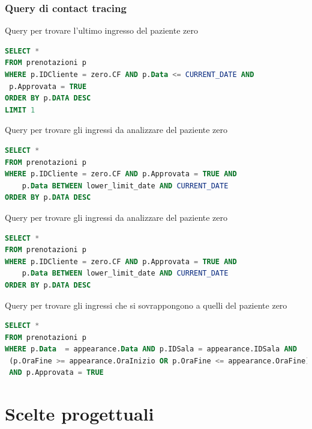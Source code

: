 \documentclass[a4paper,11pt,titlepage]{article}
\begin{document}
\subsubsection{Query di contact tracing}
Query per trovare l'ultimo ingresso del paziente zero
\begin{lstlisting}[language=SQL]
SELECT *
FROM prenotazioni p
WHERE p.IDCliente = zero.CF AND p.Data <= CURRENT_DATE AND
 p.Approvata = TRUE
ORDER BY p.DATA DESC
LIMIT 1
\end{lstlisting}

Query per trovare gli ingressi da analizzare del paziente zero
\begin{lstlisting}[language=SQL]
SELECT *
FROM prenotazioni p
WHERE p.IDCliente = zero.CF AND p.Approvata = TRUE AND
	p.Data BETWEEN lower_limit_date AND CURRENT_DATE
ORDER BY p.DATA DESC
\end{lstlisting}

Query per trovare gli ingressi da analizzare del paziente zero
\begin{lstlisting}[language=SQL]
SELECT *
FROM prenotazioni p
WHERE p.IDCliente = zero.CF AND p.Approvata = TRUE AND
	p.Data BETWEEN lower_limit_date AND CURRENT_DATE
ORDER BY p.DATA DESC
\end{lstlisting}


Query per trovare gli ingressi che si sovrappongono a quelli del paziente zero
\begin{lstlisting}[language=SQL]
SELECT *
FROM prenotazioni p
WHERE p.Data  = appearance.Data AND p.IDSala = appearance.IDSala AND
 (p.OraFine >= appearance.OraInizio OR p.OraFine <= appearance.OraFine) 
 AND p.Approvata = TRUE
\end{lstlisting}

\section{Scelte progettuali}
\end{document}
